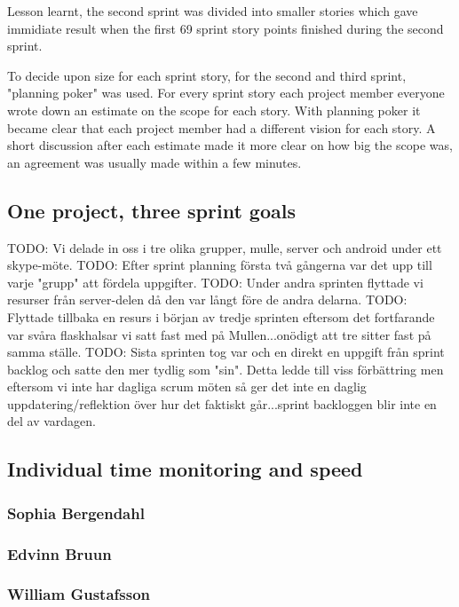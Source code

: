 Lesson learnt, the second sprint was divided into smaller stories which gave immidiate result when the first 69 sprint story points finished during the second sprint.

To decide upon size for each sprint story, for the second and third sprint, "planning poker" \cite[p.~42]{kniberg07} was used.
For every sprint story each project member everyone wrote down an estimate on the scope for each story.
With planning poker it became clear that each project member had a different vision for each story.
A short discussion after each estimate made it more clear on how big the scope was, an agreement was usually made within a few minutes.

%
%
\subsection{One project, three sprint goals}
TODO: Vi delade in oss i tre olika grupper, mulle, server och android under ett skype-möte.
TODO: Efter sprint planning första två gångerna var det upp till varje "grupp" att fördela uppgifter.
TODO: Under andra sprinten flyttade vi resurser från server-delen då den var långt före de andra delarna.
TODO: Flyttade tillbaka en resurs i början av tredje sprinten eftersom det fortfarande var svåra flaskhalsar vi satt fast med på Mullen...onödigt att tre sitter fast på samma ställe.
TODO: Sista sprinten tog var och en direkt en uppgift från sprint backlog och satte den mer tydlig som "sin". Detta ledde till viss förbättring men eftersom vi inte har dagliga scrum möten så ger det inte en daglig uppdatering/reflektion över hur det faktiskt går...sprint backloggen blir inte en del av vardagen.
\subsection{Individual time monitoring and speed}
\subsubsection{Sophia Bergendahl}
\subsubsection{Edvinn Bruun}
\subsubsection{William Gustafsson}
